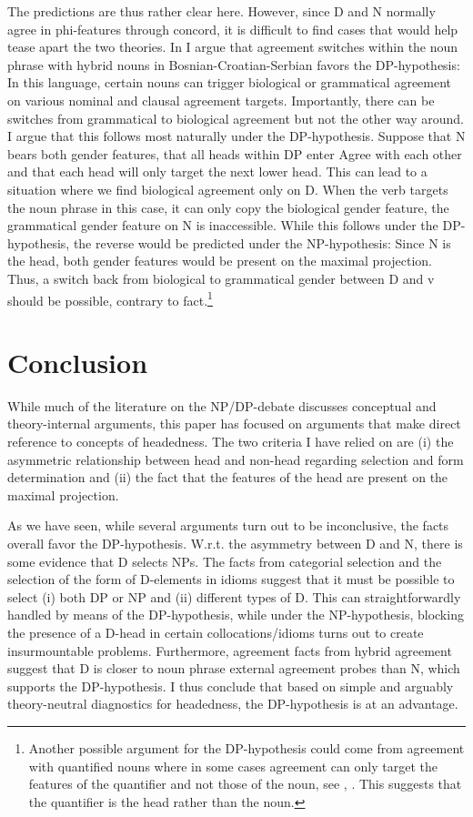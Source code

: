 \documentclass[output=paper,colorlinks,citecolor=black,
]{langscibook}
\begin{document}
The predictions are thus rather clear here. However, since D and N normally agree in phi-features through concord, it is difficult to find cases that would help tease apart the two theories. In \citet{Salzmann:2020:NP-DP} I argue that agreement switches within the noun phrase with hybrid nouns in Bosnian-Croatian-Serbian favors the DP-hypothesis: In this language, certain nouns can trigger biological or grammatical agreement on various nominal and clausal agreement targets. Importantly, there can be switches from grammatical to biological agreement but not the other way around. I argue that this follows most naturally under the DP-hypothesis. Suppose that N bears both gender features, that all heads within DP enter Agree with each other and that each head will only target the next lower head. This can lead to a situation where we find biological agreement only on D. When the verb targets the noun phrase in this case, it can only copy the biological gender feature, the grammatical gender feature on N is inaccessible. While this follows under the DP-hypothesis, the reverse would be predicted under the NP-hypothesis: Since N is the head, both gender features would be present on the maximal projection. Thus, a switch back from biological to grammatical gender between D and v should be possible, contrary to fact.\footnote{Another possible argument for the DP-hypothesis could come from agreement with quantified nouns where in some cases agreement can only target the features of the quantifier and not those of the noun, see \citet{Danon:2013:AgreementAlternationQuantifiedNom}, \citet{Driemel-Stojkovic2019:AgreeQP}. This suggests that the quantifier is the head rather than the noun.}

\section{Conclusion}
\label{sec-conclusion}

While much of the literature on the NP/DP-debate discusses conceptual and theory-internal arguments, this paper has focused on arguments that make direct reference to concepts of headedness. The two criteria I have relied on are (i) the asymmetric relationship between head and non-head regarding selection and form determination and (ii) the fact that the features of the head are present on the maximal projection. 

As we have seen, while several arguments turn out to be inconclusive, the facts overall favor the DP-hypothesis. W.r.t. the asymmetry between D and N, there is some evidence that D selects NPs. The facts from categorial selection and the selection of the form of D-elements in idioms suggest that it must be possible to select (i) both DP or NP and (ii) different types of D. This can straightforwardly handled by means of the DP-hypothesis, while under the NP-hypothesis, blocking the presence of a D-head in certain collocations/idioms turns out to create insurmountable problems. Furthermore, agreement facts from hybrid agreement suggest that D is closer to noun phrase external agreement probes than N, which supports the DP-hypothesis. I thus conclude that based on simple and arguably theory-neutral diagnostics for headedness, the DP-hypothesis is at an advantage.
\end{document}
